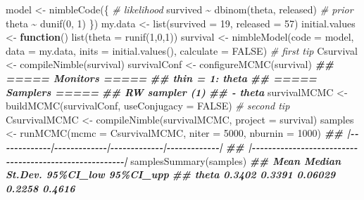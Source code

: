 \documentclass[
  12pt,
]{krantz}
\newenvironment{Shaded}{\begin{snugshade}}{\end{snugshade}}
\newcommand{\AttributeTok}[1]{\textcolor[rgb]{0.77,0.63,0.00}{#1}}
\newcommand{\CommentTok}[1]{\textcolor[rgb]{0.56,0.35,0.01}{\textit{#1}}}
\newcommand{\ConstantTok}[1]{\textcolor[rgb]{0.00,0.00,0.00}{#1}}
\newcommand{\ControlFlowTok}[1]{\textcolor[rgb]{0.13,0.29,0.53}{\textbf{#1}}}
\newcommand{\DecValTok}[1]{\textcolor[rgb]{0.00,0.00,0.81}{#1}}
\newcommand{\DocumentationTok}[1]{\textcolor[rgb]{0.56,0.35,0.01}{\textbf{\textit{#1}}}}
\newcommand{\FunctionTok}[1]{\textcolor[rgb]{0.00,0.00,0.00}{#1}}
\newcommand{\NormalTok}[1]{#1}
\newcommand{\OtherTok}[1]{\textcolor[rgb]{0.56,0.35,0.01}{#1}}
\newcommand{\SpecialCharTok}[1]{\textcolor[rgb]{0.00,0.00,0.00}{#1}}
\begin{document}
\begin{Shaded}
\begin{Highlighting}[]
\NormalTok{model }\OtherTok{\textless{}{-}} \FunctionTok{nimbleCode}\NormalTok{(\{}
  \CommentTok{\# likelihood}
\NormalTok{  survived }\SpecialCharTok{\textasciitilde{}} \FunctionTok{dbinom}\NormalTok{(theta, released)}
  \CommentTok{\# prior}
\NormalTok{  theta }\SpecialCharTok{\textasciitilde{}} \FunctionTok{dunif}\NormalTok{(}\DecValTok{0}\NormalTok{, }\DecValTok{1}\NormalTok{)}
\NormalTok{\})}
\NormalTok{my.data }\OtherTok{\textless{}{-}} \FunctionTok{list}\NormalTok{(}\AttributeTok{survived =} \DecValTok{19}\NormalTok{, }\AttributeTok{released =} \DecValTok{57}\NormalTok{)}
\NormalTok{initial.values }\OtherTok{\textless{}{-}} \ControlFlowTok{function}\NormalTok{() }\FunctionTok{list}\NormalTok{(}\AttributeTok{theta =} \FunctionTok{runif}\NormalTok{(}\DecValTok{1}\NormalTok{,}\DecValTok{0}\NormalTok{,}\DecValTok{1}\NormalTok{))}
\NormalTok{survival }\OtherTok{\textless{}{-}} \FunctionTok{nimbleModel}\NormalTok{(}\AttributeTok{code =}\NormalTok{ model, }
                        \AttributeTok{data =}\NormalTok{ my.data, }
                        \AttributeTok{inits =} \FunctionTok{initial.values}\NormalTok{(),}
                        \AttributeTok{calculate =} \ConstantTok{FALSE}\NormalTok{) }\CommentTok{\# first tip}
\NormalTok{Csurvival }\OtherTok{\textless{}{-}} \FunctionTok{compileNimble}\NormalTok{(survival)}
\NormalTok{survivalConf }\OtherTok{\textless{}{-}} \FunctionTok{configureMCMC}\NormalTok{(survival)}
\DocumentationTok{\#\# ===== Monitors =====}
\DocumentationTok{\#\# thin = 1: theta}
\DocumentationTok{\#\# ===== Samplers =====}
\DocumentationTok{\#\# RW sampler (1)}
\DocumentationTok{\#\#   {-} theta}
\NormalTok{survivalMCMC }\OtherTok{\textless{}{-}} \FunctionTok{buildMCMC}\NormalTok{(survivalConf, }\AttributeTok{useConjugacy =} \ConstantTok{FALSE}\NormalTok{) }\CommentTok{\# second tip}
\NormalTok{CsurvivalMCMC }\OtherTok{\textless{}{-}} \FunctionTok{compileNimble}\NormalTok{(survivalMCMC, }
                               \AttributeTok{project =}\NormalTok{ survival)}
\NormalTok{samples }\OtherTok{\textless{}{-}} \FunctionTok{runMCMC}\NormalTok{(}\AttributeTok{mcmc =}\NormalTok{ CsurvivalMCMC, }
                   \AttributeTok{niter =} \DecValTok{5000}\NormalTok{, }
                   \AttributeTok{nburnin =} \DecValTok{1000}\NormalTok{)}
\DocumentationTok{\#\# |{-}{-}{-}{-}{-}{-}{-}{-}{-}{-}{-}{-}{-}|{-}{-}{-}{-}{-}{-}{-}{-}{-}{-}{-}{-}{-}|{-}{-}{-}{-}{-}{-}{-}{-}{-}{-}{-}{-}{-}|{-}{-}{-}{-}{-}{-}{-}{-}{-}{-}{-}{-}{-}|}
\DocumentationTok{\#\# |{-}{-}{-}{-}{-}{-}{-}{-}{-}{-}{-}{-}{-}{-}{-}{-}{-}{-}{-}{-}{-}{-}{-}{-}{-}{-}{-}{-}{-}{-}{-}{-}{-}{-}{-}{-}{-}{-}{-}{-}{-}{-}{-}{-}{-}{-}{-}{-}{-}{-}{-}{-}{-}{-}{-}|}
\FunctionTok{samplesSummary}\NormalTok{(samples)}
\DocumentationTok{\#\#         Mean Median St.Dev. 95\%CI\_low 95\%CI\_upp}
\DocumentationTok{\#\# theta 0.3402 0.3391 0.06029    0.2258    0.4616}
\end{Highlighting}
\end{Shaded}
\end{document}
